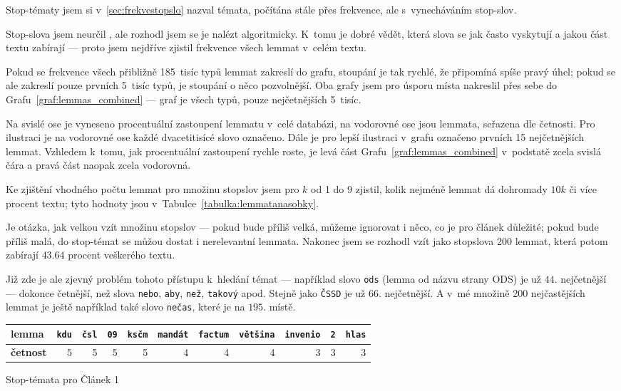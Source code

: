 \documentclass[12pt,a4paper]{report}
\begin{document}

Stop-tématy jsem si v~\ref{sec:frekvestopslo} nazval témata, počítána stále  přes frekvence, ale s~vynecháváním stop-slov.

Stop-slova jsem neurčil , ale rozhodl jsem se je nalézt algoritmicky. K~tomu je dobré vědět, která slova se jak často vyskytují a jakou část textu zabírají --- proto jsem nejdříve zjistil frekvence všech lemmat v~celém textu. 

Pokud se frekvence všech přibližně 185~tisíc typů lemmat zakreslí do grafu, stoupání je tak rychlé, že připomíná spíše pravý úhel; pokud se ale zakreslí pouze prvních 5~tisíc typů, je stoupání o něco pozvolnější. Oba grafy jsem pro úsporu místa nakreslil přes sebe do Grafu~\ref{graf:lemmas_combined} ---  graf je všech typů,  pouze nejčetnějších 5~tisíc.

Na svislé ose je vyneseno procentuální zastoupení lemmatu v~celé databázi, na vodorovné ose jsou lemmata, seřazena dle četnosti. Pro ilustraci je na vodorovné ose každé dvacetitisícé slovo označeno. Dále je pro lepší ilustraci v~grafu označeno prvních 15 nejčetnějších lemmat. Vzhledem k~tomu, jak procentuální zastoupení rychle roste, je levá část Grafu~\ref{graf:lemmas_combined} v~podstatě zcela svislá čára a pravá část naopak zcela vodorovná.


Ke zjištění vhodného počtu lemmat pro množinu stopslov jsem pro $k$ od 1 do 9 zjistil, kolik nejméně lemmat dá dohromady $10k$ či více procent textu; tyto hodnoty jsou v~Tabulce~\ref{tabulka:lemmatanasobky}.

Je otázka, jak velkou vzít množinu stopslov --- pokud bude příliš velká, můžeme ignorovat i něco, co je pro článek důležité; pokud bude příliš malá, do stop-témat se můžou dostat i nerelevantní lemmata. Nakonec jsem se rozhodl vzít jako stopslova 200 lemmat, která potom zabírají $43.64$ procent veškerého textu.

Již zde je ale zjevný problém tohoto přístupu k~hledání témat --- například slovo \texttt{ods} (lemma od názvu strany ODS) je už $44.$ nejčetnější --- dokonce četnější, než slova \texttt{nebo}, \texttt{aby}, \texttt{než}, \texttt{takový} apod. Stejně jako \texttt{ČSSD} je už $66.$ nejčetnější. A v~mé množině 200 nejčastějších lemmat je ještě například také slovo \texttt{nečas}, které je na $195.$ místě.


{
    \begin{tabular}{ |l | r |r |r |r |r |r |r |r |r |r | }
        \hline
        \textbf{lemma} & 
        \texttt{kdu} & 
        \texttt{čsl} & 
        \texttt{09} & 
        \texttt{ksčm} & 
        \texttt{mandát} &
        \texttt{factum} & 
        \texttt{většina} & 
        \texttt{invenio} & 
        \texttt{2} & 
        \texttt{hlas} \\ \hline
        
        \textbf{četnost}  & 5 & 5 & 5 & 5 & 4 & 4 & 4 & 3 & 3 & 3 \\ \hline
        
        
      \end{tabular}

}{Stop-témata pro Článek 1}
\end{document}
